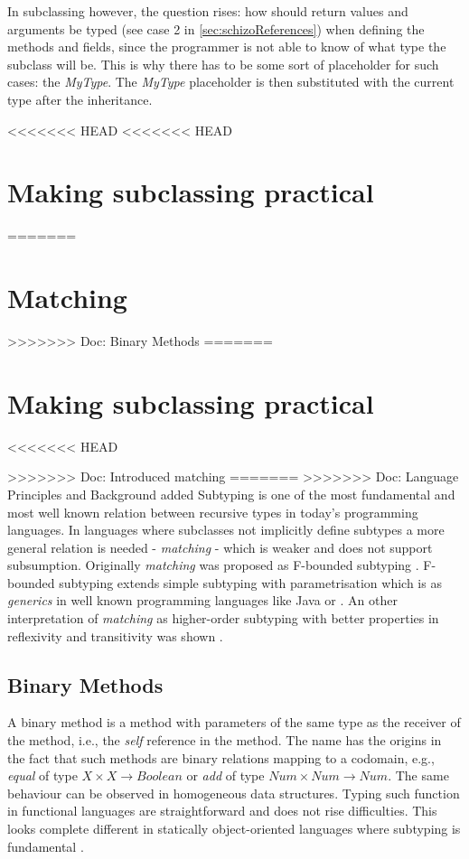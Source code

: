 In subclassing however, the question rises: how should return values
and arguments be typed (see case 2 in \ref{sec:schizoReferences})
when defining the methods and fields, since the programmer is not able
to know of what type the subclass will be. This is why there has to
be some sort of placeholder for such cases: the \emph{MyType}. The
\emph{MyType} placeholder is then substituted with the current type
after the inheritance.

<<<<<<< HEAD
<<<<<<< HEAD
\chapter{Making subclassing practical}
=======
\chapter{Matching}
>>>>>>> Doc: Binary Methods
=======
\chapter{Making subclassing practical}
<<<<<<< HEAD

>>>>>>> Doc: Introduced matching
=======
>>>>>>> Doc: Language Principles and Background added
Subtyping is one of the most fundamental and most well known relation
between recursive types in today's programming languages. In languages
where subclasses not implicitly define subtypes a more general
relation is needed - \emph{matching} - which is weaker and does
not support subsumption. Originally \emph{matching} was proposed
as F-bounded subtyping \cite{canning_f-bounded_1989}. F-bounded
subtyping extends simple subtyping with parametrisation which is as
\emph{generics} in well known programming languages like Java or \CS
\cite{barron-estrada_inheritance_2003}. An other interpretation of
\emph{matching} as higher-order subtyping with better properties in
reflexivity and transitivity was shown \cite{abadi_subtyping_1996}.

\section{Binary Methods}
A binary method is a method with parameters of the same type as the
receiver of the method, i.e., the \emph{self} reference in the method. The
name has the origins in the fact that such methods are binary relations
mapping to a codomain, e.g., \emph{equal} of type $X \times X \rightarrow
Boolean$ or \emph{add} of type $Num \times Num \rightarrow Num$. The
same behaviour can be observed in homogeneous data structures. Typing
such function in functional languages are straightforward and does not
rise difficulties. This looks complete different in statically object-oriented
languages where subtyping is fundamental \cite{bruce_binary_1995}.

